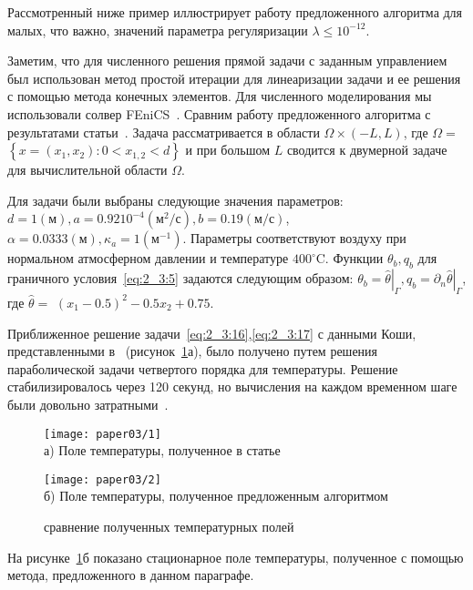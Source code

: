 Рассмотренный ниже пример иллюстрирует работу предложенного
алгоритма для малых, что важно, значений параметра регуляризации
$\lambda \leq 10^{-12}$.


Заметим, что для численного решения прямой задачи с заданным управлением
был использован метод простой итерации для линеаризации задачи и ее решения
с помощью метода конечных элементов.
Для численного моделирования мы использовали солвер FEniCS~\cite{fenics, dolfin}.
Сравним работу предложенного
алгоритма с результатами статьи~\cite{Chebotarev2019Problem}.
Задача рассматривается в области $\Omega \times(-L, L)$,
где $\Omega=$ $\left\{x=\left(x_{1}, x_{2}\right): 0<x_{1,2}<d\right\}$
и при большом $L$ сводится к двумерной задаче для вычислительной
области $\Omega$.

Для задачи были выбраны следующие значения параметров:
$d=1(\text{м}), a=0.9210^{-4}(\text{м}^{2} / \text{с}),
b=0.19(\text{м} / \text{с})$, $\alpha=0.0333(\text{м}),
\kappa_{a}=1\left(\text{м}^{-1}\right)$.
Параметры соответствуют воздуху при нормальном атмосферном давлении
и температуре $400^{\circ} \text{C}$.
Функции $\theta_{b}, q_{b}$ для граничного условия~\eqref{eq:2_3:5}
задаются следующим образом: $\theta_{b}=\left.\widehat{\theta}\right|_{\Gamma},
q_{b}=\left.\partial_{n} \widehat{\theta}\right|_{\Gamma}$,
где $\widehat{\theta}=$ $\left(x_{1}-0.5\right)^{2}-0.5 x_{2}+0.75$.

Приближенное решение задачи~\eqref{eq:2_3:16},\eqref{eq:2_3:17}
с данными Коши, представленными в~\cite{Chebotarev2019Problem}
(рисунок~\ref{fig:4_3:1}а), было получено путем решения параболической задачи
четвертого порядка для температуры.
Решение стабилизировалось через 120 секунд, но
вычисления на каждом временном шаге были
довольно затратными~\cite{Chebotarev2019Problem}.
\begin{figure}[h!t]
    \begin{minipage}[b][][b]{0.49\linewidth}
        \centering
        \texttt{[image: paper03/1]} \\ а) Поле температуры,
        полученное в статье~\cite{Chebotarev2019Problem}
    \end{minipage}
    \hfill
    \begin{minipage}[b][][b]{0.49\linewidth}
        \centering
        \texttt{[image: paper03/2]} \\
        б) Поле температуры, полученное предложенным алгоритмом
    \end{minipage}
    \caption{сравнение полученных температурных полей}
    \label{fig:4_3:1}
\end{figure}
На рисунке~\ref{fig:4_3:1}б показано стационарное поле температуры,
полученное с помощью метода, предложенного в данном параграфе.

